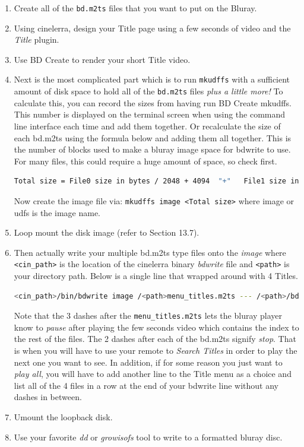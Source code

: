 \begin{enumerate}
    \item Create all of the \texttt{bd.m2ts} files that you want to put on the Bluray.
    \item Using cinelerra, design your Title page using a few seconds of video and the \textit{Title} plugin.
    \item Use BD Create to render your short Title video.
    \item Next is the most complicated part which is to run \texttt{mkudffs} with a sufficient amount of disk space to hold all of the \texttt{bd.m2ts} files \textit{plus a little more!}  To calculate this, you can record the sizes from having run BD Create mkudffs.  This number is displayed on the terminal screen when using the command line interface each time and add them together.  Or recalculate the size of each bd.m2ts using the formula below and adding them all together.  This is the number of blocks used to make a bluray image space for bdwrite to use.  For many files, this could require a huge amount of space, so check first.
    \begin{lstlisting}[language=bash]
    Total size = File0 size in bytes / 2048 + 4094  "+"   File1 size in bytes / 2048 + 4094  "+" ...
    \end{lstlisting}
    Now create the image file via:   \texttt{mkudffs image <Total size>}  where image or udfs is the image name.
    \item Loop mount the disk image (refer to Section 13.7).
    \item Then actually write your multiple bd.m2ts type files onto the \textit{image} where \texttt{<cin\_path>} is the location of the cinelerra binary \textit{bdwrite} file and \texttt{<path>} is your directory path.  Below is a single line that wrapped around with 4 Titles.
    \begin{lstlisting}[language=bash]
    <cin_path>/bin/bdwrite image /<path>menu_titles.m2ts --- /<path>/bd1.m2ts -- /<path>/bd2.m2ts -- /<path>/bd3.m2ts -- /<path>bd4.m2ts
    \end{lstlisting}
    Note that the 3 dashes after the \texttt{menu\_titles.m2ts} lets the bluray player know to \textit{pause} after playing the few seconds video which contains the index to the rest of the files.  The 2 dashes after each of the bd.m2ts signify \textit{stop}.  That is when you will have to use your remote to \textit{Search Titles} in order to play the next one you want to see.  In addition, if for some reason you just want to \textit{play all}, you will have to add another line to the Title menu as a choice and list all of the 4 files in a row at the end of your bdwrite line without any dashes in between.
    \item Umount the loopback disk.
    \item Use your favorite \textit{dd} or \textit{growisofs} tool to write to a formatted bluray disc.
\end{enumerate}

